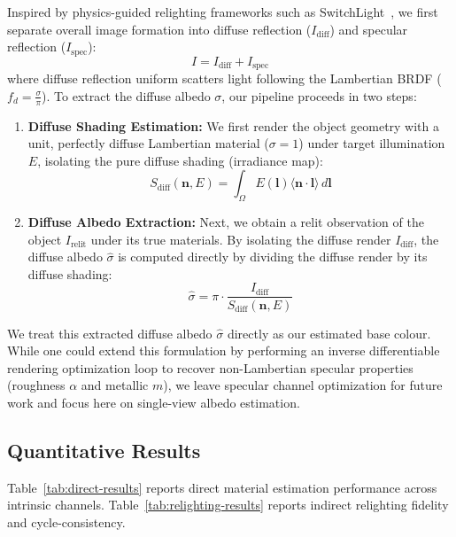 \documentclass[11pt]{article}
\begin{document}
Inspired by physics-guided relighting frameworks such as SwitchLight~\cite{switchlight}, we first separate overall image formation into diffuse reflection ($I_{\text{diff}}$) and specular reflection ($I_{\text{spec}}$):
\begin{equation}
  I = I_{\text{diff}} + I_{\text{spec}}
\end{equation}
where diffuse reflection uniform scatters light following the Lambertian BRDF ($f_d = \frac{\sigma}{\pi}$). To extract the diffuse albedo $\sigma$, our pipeline proceeds in two steps:
\begin{enumerate}
  \item \textbf{Diffuse Shading Estimation:} We first render the object geometry with a unit, perfectly diffuse Lambertian material ($\sigma = 1$) under target illumination $E$, isolating the pure diffuse shading (irradiance map):
  \begin{equation}
    S_{\text{diff}}(\mathbf{n}, E) = \int_{\Omega} E(\mathbf{l}) \langle \mathbf{n} \cdot \mathbf{l} \rangle \, d\mathbf{l}
  \end{equation}
  \item \textbf{Diffuse Albedo Extraction:} Next, we obtain a relit observation of the object $I_{\text{relit}}$ under its true materials. By isolating the diffuse render $I_{\text{diff}}$, the diffuse albedo $\hat{\sigma}$ is computed directly by dividing the diffuse render by its diffuse shading:
  \begin{equation}
    \hat{\sigma} = \pi \cdot \frac{I_{\text{diff}}}{S_{\text{diff}}(\mathbf{n}, E)}
  \end{equation}
\end{enumerate}

We treat this extracted diffuse albedo $\hat{\sigma}$ directly as our estimated base colour. While one could extend this formulation by performing an inverse differentiable rendering optimization loop to recover non-Lambertian specular properties (roughness $\alpha$ and metallic $m$), we leave specular channel optimization for future work and focus here on single-view albedo estimation.

\subsection{Quantitative Results}

Table~\ref{tab:direct-results} reports direct material estimation performance across intrinsic channels. Table~\ref{tab:relighting-results} reports indirect relighting fidelity and cycle-consistency.
\end{document}
